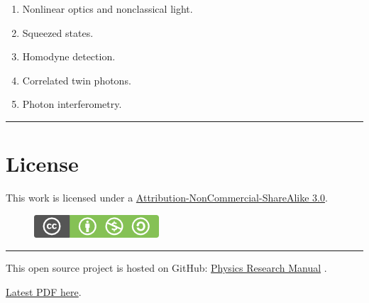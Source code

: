 \documentclass[letterpaper,10pt,english]{sphinxmanual}
\begin{document}
\begin{enumerate}
\begin{enumerate}
\item {} 
Nonlinear optics and nonclassical light.

\item {} 
Squeezed states.

\item {} 
Homodyne detection.

\item {} 
Correlated twin photons.

\item {} 
Photon interferometry.

\end{enumerate}

\end{enumerate}


\bigskip\hrule{}\bigskip



\chapter{License}
\label{index:license}
This work is licensed under a \href{http://creativecommons.org/licenses/by-nc-sa/3.0/}{Attribution-NonCommercial-ShareAlike 3.0}.
\begin{figure}[htbp]
\centering
\href{http://creativecommons.org/licenses/by-nc-sa/3.0/us/}{\includegraphics{cc_byncsa.png}}\end{figure}


\bigskip\hrule{}\bigskip


This open source project is hosted on GitHub: \href{https://github.com/CosmologyTaskForce/PhysicsResearchSurvivalManual}{Physics Research Manual} .

\href{https://github.com/CosmologyTaskForce/PhysicsResearchSurvivalManual/raw/master/\_build/latex/physics-research-survival-manual.pdf}{Latest PDF here}.



\renewcommand{\indexname}{Index}
\printindex
\end{document}

